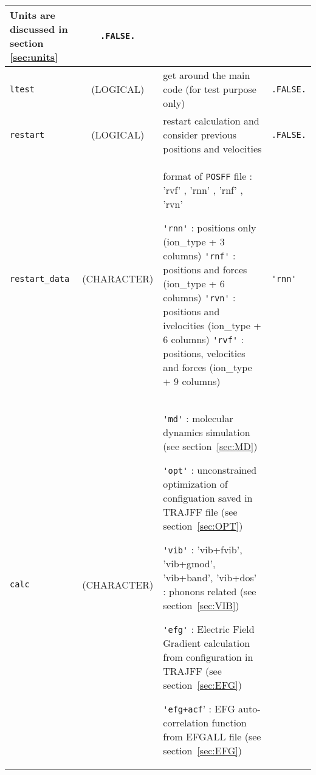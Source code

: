 \documentclass[a4paper]{article}
\begin{document}
\begin{longtable}{l|c|m{8cm}|m{2cm}}
					 Units are discussed in section \ref{sec:units} \newline                            & \verb?.FALSE.? \\ 
\hline
\rule[-0.75cm]{0cm}{1.5cm}
\verb?ltest?     & (LOGICAL)          &  get around the main code (for test purpose only)                                   & \verb?.FALSE.? \\
\hline
\rule[-0.75cm]{0cm}{1.5cm}
\verb?restart?  & (LOGICAL)           &  restart calculation and consider previous positions and velocities                 & \verb?.FALSE.? \\
\hline
\rule[-0.75cm]{0cm}{1.5cm}
\verb?restart_data?  & (CHARACTER)    &  format of  \verb?POSFF? file : 'rvf' , 'rnn' , 'rnf' , 'rvn' \newline

                                         \verb?'rnn'? : positions only                   (ion\_type + 3 columns) \newline 
                                         \verb?'rnf'? : positions and forces             (ion\_type + 6 columns) \newline 
                                         \verb?'rvn'? : positions and ivelocities        (ion\_type + 6 columns) \newline 
                                         \verb?'rvf'? : positions, velocities and forces (ion\_type + 9 columns) 

                                                                                                                            & \verb?'rnn'? \tabularnewline
\hline
\rule[-2.5cm]{0cm}{5cm}
\verb?calc?      & (CHARACTER)        & \newline \verb?'md'?  : molecular dynamics simulation (see section~\ref{sec:MD}) \newline

                                        \verb?'opt'? : unconstrained optimization of configuation saved in TRAJFF file 
					(see section~\ref{sec:OPT}) \newline

					\verb?'vib'? : 'vib+fvib', 'vib+gmod', 'vib+band', 'vib+dos' : phonons related 
					(see section~\ref{sec:VIB})\newline

					\verb?'efg'? : Electric Field Gradient calculation from configuration in TRAJFF 
					(see section~\ref{sec:EFG})\newline

					\verb?'efg+acf?' : EFG auto-correlation function from EFGALL file 
					(see section~\ref{sec:EFG})\newline


\end{longtable}
\end{document}
